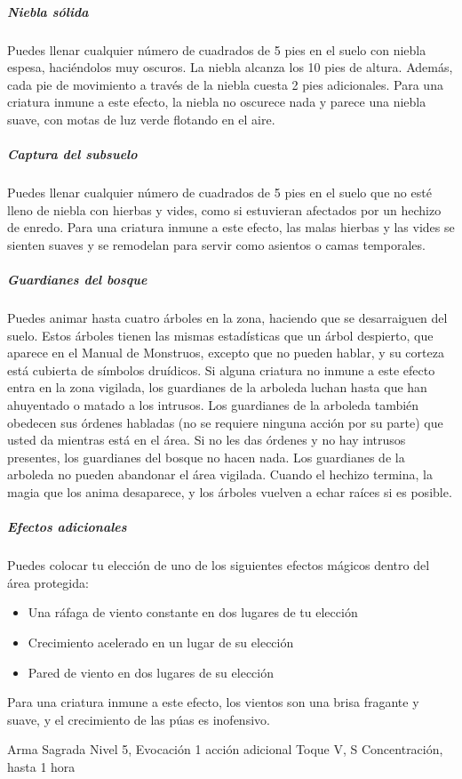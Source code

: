 \documentclass[a4paper,twocolumn,openany,10pt]{dndbook}
\begin{document}
	\subparagraph{Niebla sólida} Puedes llenar cualquier número de cuadrados de 5 pies en el suelo con niebla espesa,
	haciéndolos muy oscuros. La niebla alcanza los 10 pies de altura. Además, cada pie de movimiento a través de la niebla
	cuesta 2 pies adicionales. Para una criatura inmune a este efecto, la niebla no oscurece nada y parece una niebla suave, con
	motas de luz verde flotando en el aire.

	\subparagraph{Captura del subsuelo} Puedes llenar cualquier número de cuadrados de 5 pies en el suelo que no esté lleno de
	niebla con hierbas y vides, como si estuvieran afectados por un hechizo de enredo. Para una criatura inmune a este efecto,
	las malas hierbas y las vides se sienten suaves y se remodelan para servir como asientos o camas temporales.

	\subparagraph{Guardianes del bosque} Puedes animar hasta cuatro árboles en la zona, haciendo que se desarraiguen del suelo.
	Estos árboles tienen las mismas estadísticas que un árbol despierto, que aparece en el Manual de Monstruos, excepto que no
	pueden hablar, y su corteza está cubierta de símbolos druídicos. Si alguna criatura no inmune a este efecto entra en la zona
	vigilada, los guardianes de la arboleda luchan hasta que han ahuyentado o matado a los intrusos. Los guardianes de la
	arboleda también obedecen sus órdenes habladas (no se requiere ninguna acción por su parte) que usted da mientras está en el
	área. Si no les das órdenes y no hay intrusos presentes, los guardianes del bosque no hacen nada. Los guardianes de la
	arboleda no pueden abandonar el área vigilada. Cuando el hechizo termina, la magia que los anima desaparece, y los árboles
	vuelven a echar raíces si es posible.

	\subparagraph{Efectos adicionales} Puedes colocar tu elección de uno de los siguientes efectos mágicos dentro del área
	protegida:

	\begin{itemize}
		\item Una ráfaga de viento constante en dos lugares de tu elección
		\item Crecimiento acelerado en un lugar de su elección
		\item Pared de viento en dos lugares de su elección
	\end{itemize}

	Para una criatura inmune a este efecto, los vientos son una brisa fragante y suave, y el crecimiento de las púas es
	inofensivo. 

\spellheader%
	{Arma Sagrada}
	{Nivel 5, Evocación}
	{1 acción adicional}
	{Toque}
	{V, S}
	{Concentración, hasta 1 hora}
	
\end{document}
